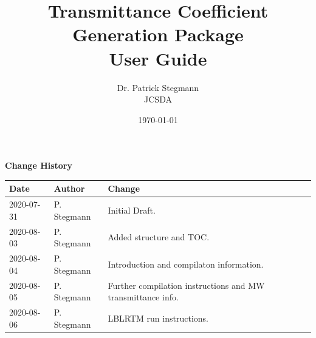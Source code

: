 

\title{Transmittance Coefficient Generation Package\\ \normalsize{User Guide}}
\author{Dr. Patrick Stegmann\\ JCSDA}
\date{\today}




\maketitle

\draftwatermark

\tableofcontents

\newpage

\thispagestyle{empty}
\vspace*{10cm}
\begin{center}
  {\sffamily\Large\bfseries Change History}
  \begin{table}[htp]
    \centering
    \begin{tabular}{|p{2cm}|p{3cm}|p{8cm}|}
      \hline
      \sffamily\textbf{Date} & \sffamily\textbf{Author} & \sffamily\textbf{Change}\\
      \hline\hline
      2020-07-31 & P. Stegmann& Initial Draft.\\
      2020-08-03 & P. Stegmann& Added structure and TOC.\\
      2020-08-04 & P. Stegmann& Introduction and compilaton information.\\
      2020-08-05 & P. Stegmann& Further compilation instructions and MW transmittance info.\\
      2020-08-06 & P. Stegmann& LBLRTM run instructions.\\
      \hline
    \end{tabular}
  \end{table}
\end{center}
\clearpage
{}
\setcounter{page}{1}


%

